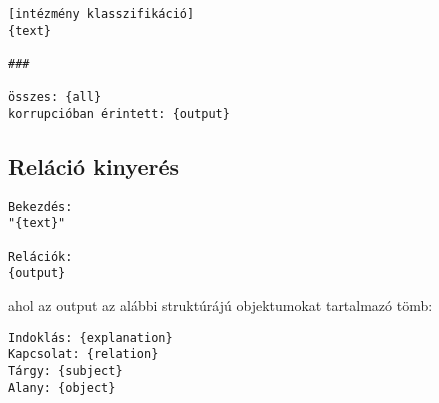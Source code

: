 \begin{verbatim}
[intézmény klasszifikáció]
{text}

###

összes: {all}
korrupcióban érintett: {output}
\end{verbatim}

\subsection{Reláció kinyerés}

\begin{verbatim}
Bekezdés:
"{text}"

Relációk:
{output}
\end{verbatim}

ahol az output az alábbi struktúrájú objektumokat tartalmazó tömb:

\begin{verbatim}
Indoklás: {explanation}
Kapcsolat: {relation}
Tárgy: {subject}
Alany: {object}
\end{verbatim}